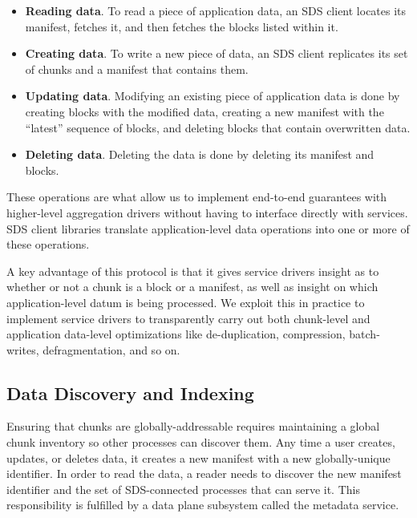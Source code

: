 \begin{itemize}
   \item \textbf{Reading data}.  To read a piece of application data, an SDS client locates
    its manifest, fetches it, and then fetches the blocks listed within it.

   \item \textbf{Creating data}.  To write a new piece of data, an SDS client replicates
    its set of chunks and a manifest that contains them.

   \item \textbf{Updating data}.  Modifying an existing
    piece of application data is done by creating blocks with the modified data,
    creating a new manifest with the ``latest'' sequence of blocks, and deleting
    blocks that contain overwritten data.

   \item \textbf{Deleting data}.  Deleting the data is done by
    deleting its manifest and blocks.
\end{itemize}

These operations are what allow us to implement end-to-end
guarantees with higher-level aggregation drivers without having to interface
directly with services.  SDS client libraries translate application-level data
operations into one or more of these operations.

A key advantage of this protocol is that it gives service drivers insight as to whether or not a
chunk is a block or a manifest, as well as insight on which application-level
datum is being processed.  We exploit this in practice to implement
service drivers to transparently carry out both chunk-level and application
data-level optimizations like de-duplication, compression, batch-writes,
defragmentation, and so on.

\subsection{Data Discovery and Indexing}

Ensuring that chunks are globally-addressable requires maintaining a global
chunk inventory so other processes can discover them.  Any time a user creates,
updates, or deletes data, it creates a new manifest
with a new globally-unique identifier.  In order to read the data, a reader
needs to discover the new manifest identifier and the set of SDS-connected
processes that can serve it.  This responsibility is fulfilled by a data plane
subsystem called the metadata service.

